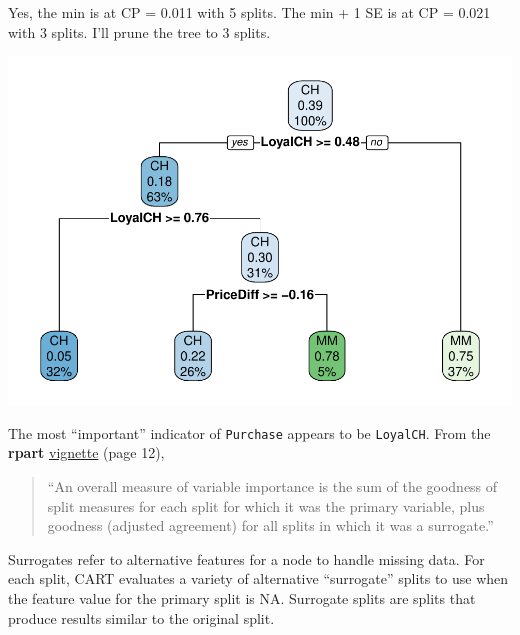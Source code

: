 \documentclass[
]{book}
\newenvironment{Shaded}{\begin{snugshade}}{\end{snugshade}}
\newcommand{\DataTypeTok}[1]{\textcolor[rgb]{0.13,0.29,0.53}{#1}}
\newcommand{\DecValTok}[1]{\textcolor[rgb]{0.00,0.00,0.81}{#1}}
\newcommand{\KeywordTok}[1]{\textcolor[rgb]{0.13,0.29,0.53}{\textbf{#1}}}
\newcommand{\NormalTok}[1]{#1}
\newcommand{\OperatorTok}[1]{\textcolor[rgb]{0.81,0.36,0.00}{\textbf{#1}}}
\newcommand{\OtherTok}[1]{\textcolor[rgb]{0.56,0.35,0.01}{#1}}
\newcommand{\StringTok}[1]{\textcolor[rgb]{0.31,0.60,0.02}{#1}}
\begin{document}
Yes, the min is at CP = 0.011 with 5 splits. The min + 1 SE is at CP = 0.021 with 3 splits. I'll prune the tree to 3 splits.

\begin{Shaded}
\end{Shaded}

\includegraphics{data-sci_files/figure-latex/unnamed-chunk-36-1.pdf}

The most ``important'' indicator of \texttt{Purchase} appears to be \texttt{LoyalCH}. From the \textbf{rpart} \href{https://cran.r-project.org/web/packages/rpart/vignettes/longintro.pdf}{vignette} (page 12),

\begin{quote}
``An overall measure of variable importance is the sum of the goodness of split measures for each split for which it was the primary variable, plus goodness (adjusted agreement) for all splits in which it was a surrogate.''
\end{quote}

Surrogates refer to alternative features for a node to handle missing data. For each split, CART evaluates a variety of alternative ``surrogate'' splits to use when the feature value for the primary split is NA. Surrogate splits are splits that produce results similar to the original split.
\end{document}
